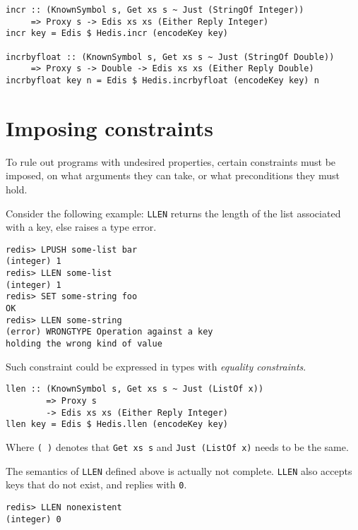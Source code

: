\documentclass[pldi]{sigplanconf-pldi16}
\begin{document}
\begin{verbatim}
incr :: (KnownSymbol s, Get xs s ~ Just (StringOf Integer))
     => Proxy s -> Edis xs xs (Either Reply Integer)
incr key = Edis $ Hedis.incr (encodeKey key)

incrbyfloat :: (KnownSymbol s, Get xs s ~ Just (StringOf Double))
     => Proxy s -> Double -> Edis xs xs (Either Reply Double)
incrbyfloat key n = Edis $ Hedis.incrbyfloat (encodeKey key) n
\end{verbatim}

\section{Imposing constraints}

To rule out programs with undesired properties, certain constraints must be
 imposed, on what arguments they can take, or what preconditions they must hold.

Consider the following example: \texttt{LLEN} returns the length of
 the list associated with a key, else raises a type error.

\begin{verbatim}
redis> LPUSH some-list bar
(integer) 1
redis> LLEN some-list
(integer) 1
redis> SET some-string foo
OK
redis> LLEN some-string
(error) WRONGTYPE Operation against a key
holding the wrong kind of value
\end{verbatim}

Such constraint could be expressed in types with
\emph{equality constraints}\cite{typeeq}.

\begin{verbatim}
llen :: (KnownSymbol s, Get xs s ~ Just (ListOf x))
        => Proxy s
        -> Edis xs xs (Either Reply Integer)
llen key = Edis $ Hedis.llen (encodeKey key)
\end{verbatim}

Where \texttt{(~)} denotes that \texttt{Get xs s}
and \texttt{Just (ListOf x)} needs to be the same.

The semantics of \texttt{LLEN} defined above is actually not
complete. \texttt{LLEN} also accepts keys that do not exist, and
 replies with \texttt{0}.

\begin{verbatim}
redis> LLEN nonexistent
(integer) 0
\end{verbatim}
\end{document}
